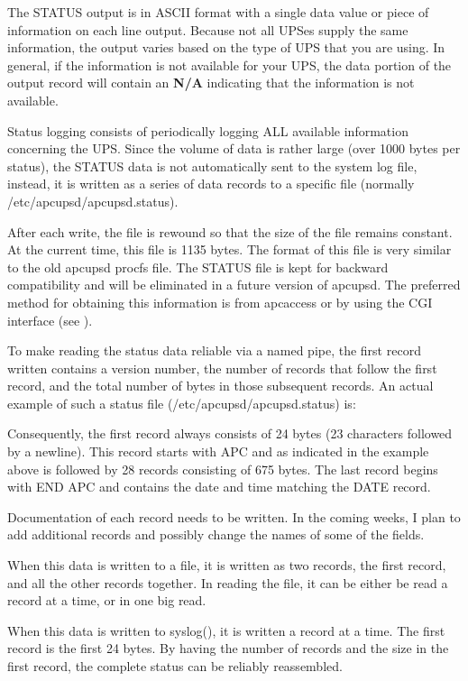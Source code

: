 {{{{{{{{\label{index-Status-Report-252}
\label{index-Report_002c-Status-253}
The STATUS output is in ASCII format with a single data value or piece of
information on each line output. Because not all UPSes supply the same
information, the output varies based on the type of UPS that you are using. In
general, if the information is not available for your UPS, the data portion of
the output record will contain an {\bf N/A} indicating that the information is
not available.  

Status logging consists of periodically logging ALL available information
concerning the UPS. Since the volume of data is rather large (over 1000 bytes
per status), the STATUS data is not automatically sent to the system log file,
instead, it is written as a series of data records to a specific file
(normally /etc/apcupsd/apcupsd.status).  

After each write, the file is rewound so that the size of the file remains
constant. At the current time, this file is 1135 bytes. The format of this
file is very similar to the old apcupsd procfs file. The STATUS file is kept
for backward compatibility and will be eliminated in a future version of
apcupsd. The preferred method for obtaining this information is from apcaccess
or by using the CGI interface (see 
).  

To make reading the status data reliable via a named pipe, the first record
written contains a version number, the number of records that follow the first
record, and the total number of bytes in those subsequent records. An actual
example of such a status file (/etc/apcupsd/apcupsd.status) is:  

Consequently, the first record always consists of 24 bytes (23 characters
followed by a newline). This record starts with APC and as indicated in the
example above is followed by 28 records consisting of 675 bytes. The last
record begins with END APC and contains the date and time matching the DATE
record.  

Documentation of each record needs to be written. In the coming weeks, I plan
to add additional records and possibly change the names of some of the fields.
 

When this data is written to a file, it is written as two records, the first
record, and all the other records together. In reading the file, it can be
either be read a record at a time, or in one big read.  

When this data is written to syslog(), it is written a record at a time. The
first record is the first 24 bytes. By having the number of records and the
size in the first record, the complete status can be reliably reassembled. 

}}}}}}}}
